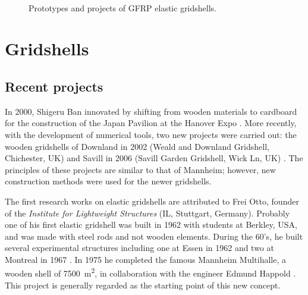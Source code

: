 \begin{figure}[h]
	\centering
		\captionsetup[subfloat]{captionskip=10pt}
		\\ \vspace{1cm}
		\vspace{10pt}
		\caption{Prototypes and projects of GFRP elastic gridshells.}
		\label{fig:proto}    
\end{figure}

\section{Gridshells}

\subsection{Recent projects}

In 2000, Shigeru Ban innovated by shifting from wooden materials to cardboard for the construction of the Japan Pavilion at the Hanover Expo \cite{McQuaid2006}. More recently, with the development of numerical tools, two new projects were carried out: the wooden gridshells of Downland in 2002 (Weald and Downland Gridshell, Chichester, UK) \cite{Harris2003} and Savill in 2006 (Savill Garden Gridshell, Wick Ln, UK) \cite{Harris2008}. The principles of these projects are similar to that of Mannheim; however, new construction methods were used for the newer gridshells.

The first research works on elastic gridshells are attributed to Frei Otto, founder of the \emph{Institute for Lightweight Structures} (IL, Stuttgart, Germany). Probably one of his first elastic gridshell was built in 1962 with students at Berkley, USA, and was made with steel rods and not wooden elements. During the 60's, he built several experimental structures including one at Essen in 1962 and two at Montreal in 1967 \cite{Liddell2015}. In 1975 he completed the famous Mannheim Multihalle, a wooden shell of \SI{7500 }{m^2}, in collaboration with the engineer Edmund Happold \cite{Happold1975,Otto1976}. This project is generally regarded as the starting point of this new concept.

